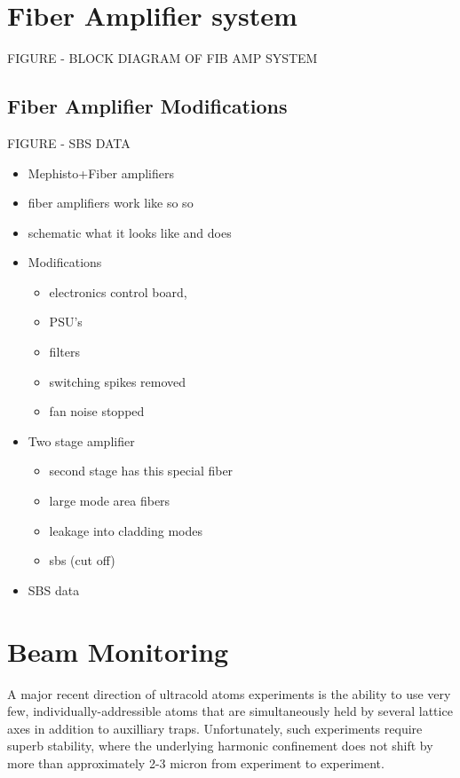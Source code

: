 \documentclass[twocolumn,aps,pra,showpacs,preprintnumbers,bibnotes]{revtex4-1}
\begin{document}
\section{Fiber Amplifier system}
FIGURE - BLOCK DIAGRAM OF FIB AMP SYSTEM

\subsection{Fiber Amplifier Modifications}
FIGURE - SBS DATA
\begin{itemize}
	\item Mephisto+Fiber amplifiers
\item fiber amplifiers work like so so
\item schematic what it looks like and does
\item Modifications
	\begin{itemize}
		\item electronics control board,
		\item PSU's
		\item filters
		\item switching spikes removed
		\item fan noise stopped
	\end{itemize}
\item Two stage amplifier
	\begin{itemize}
		\item second stage has this special fiber 
		\item large mode area fibers
		\item leakage into cladding modes 
		\item sbs (cut off)
	\end{itemize}
\item SBS data
\end{itemize}
\section{Beam Monitoring}
A major recent direction of ultracold atoms experiments is the ability to use very few, individually-addressible atoms\cite{AFM paper, quantum walks few body} that are simultaneously held by several lattice axes in addition to auxilliary traps.
Unfortunately, such experiments require superb stability, where the underlying harmonic confinement does not shift by more than approximately 2-3 micron from experiment to experiment. 
\end{document}
